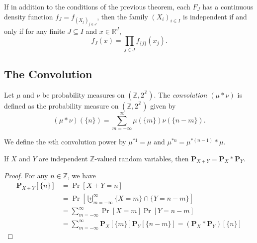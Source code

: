 \begin{corollary}
    If in addition to the conditions of the previous theorem, each $F_J$ has a continuous density function $f_J=f_{(X_j)_{j\in J}}$, then the family $(X_i)_{i\in I}$ is independent if and only if for any finite $J\subseteq I$ and $x\in\mathbb{R}^J$,
    $$f_J(x) = \prod_{j\in J}f_{\{j\}}(x_j).$$
\end{corollary}

    

\subsection{The Convolution}

\begin{definition}
    Let $\mu$ and $\nu$ be probability measures on $(\mathbb{Z},2^\mathbb{Z})$. The \textit{convolution $(\mu * \nu)$} is defined as the probability measure on $(\mathbb{Z},2^\mathbb{Z})$ given by
    $$(\mu * \nu) (\{n\}) = \sum_{m=-\infty}^\infty \mu(\{m\})\nu(\{n-m\}).$$
\end{definition}

We define the $n$th convolution power by $\mu^{*1}=\mu$ and $\mu^{*n}=\mu^{*(n-1)}*\mu$.

\begin{theorem}
    If $X$ and $Y$ are independent $\mathbb{Z}$-valued random variables, then $\textbf{P}_{X+Y}=\textbf{P}_X * \textbf{P}_Y$.
\end{theorem}
\begin{proof}
    For any $n\in\mathbb{Z}$, we have
    \begin{align*}
        \textbf{P}_{X+Y}[\{n\}] &= \Pr[X+Y=n] \\
        &= \Pr\left[\biguplus_{m=-\infty}^\infty \{X=m\}\cap\{Y=n-m\}\right] \\
        &= \sum_{m=-\infty}^\infty \Pr[X=m]\Pr[Y=n-m] \\
        &= \sum_{m=-\infty}^\infty \textbf{P}_X[\{m\}]\textbf{P}_Y[\{n-m\}] = (\textbf{P}_X * \textbf{P}_Y) [\{n\}]
    \end{align*}
\end{proof}


